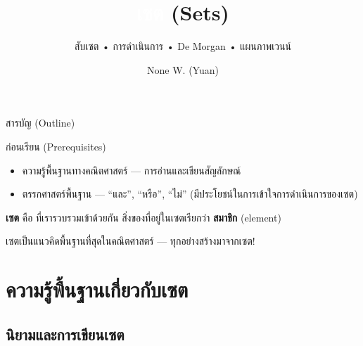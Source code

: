 \documentclass[11pt, aspectratio=169]{beamer}
\title[เซต]{\textcolor{white}{เซต} \textcolor{boxBlue!60}{(Sets)}}
\subtitle{สับเซต • การดำเนินการ • De Morgan • แผนภาพเวนน์ }
\author[None W. (Yuan)]{None W. (Yuan)}
\date{}
\begin{document}
\begin{frame}[plain]
  \titlepage
\end{frame}

\begin{frame}{สารบัญ (Outline)}
  \tableofcontents
\end{frame}

\begin{frame}{ก่อนเรียน (Prerequisites)}
  \begin{explanation}
    \begin{itemize}
      \item ความรู้พื้นฐานทางคณิตศาสตร์ — การอ่านและเขียนสัญลักษณ์
      \item ตรรกศาสตร์พื้นฐาน — ``และ'', ``หรือ'', ``ไม่'' (มีประโยชน์ในการเข้าใจการดำเนินการของเซต)
    \end{itemize}
  \end{explanation}

  \begin{intuition}
    \textbf{เซต} คือ  ที่เรารวบรวมเข้าด้วยกัน
    สิ่งของที่อยู่ในเซตเรียกว่า \textbf{สมาชิก} (element)

    \medskip
    เซตเป็นแนวคิดพื้นฐานที่สุดในคณิตศาสตร์ — ทุกอย่างสร้างมาจากเซต!
  \end{intuition}
\end{frame}

\section{ความรู้พื้นฐานเกี่ยวกับเซต}

\subsection{นิยามและการเขียนเซต}
\end{document}
